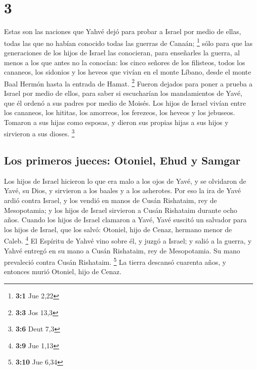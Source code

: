 \hypertarget{section-2}{%
\section{3}\label{section-2}}

 Estas son las naciones que Yahvé dejó para probar a
Israel por medio de ellas, todas las que no habían conocido todas las
guerras de Canaán; \footnote{\textbf{3:1} Jue 2,22}  sólo
para que las generaciones de los hijos de Israel las conocieran, para
enseñarles la guerra, al menos a los que antes no la conocían:
 los cinco señores de los filisteos, todos los cananeos,
los sidonios y los heveos que vivían en el monte Líbano, desde el monte
Baal Hermón hasta la entrada de Hamat. \footnote{\textbf{3:3} Jos 13,3}
 Fueron dejados para poner a prueba a Israel por medio de
ellos, para saber si escucharían los mandamientos de Yavé, que él ordenó
a sus padres por medio de Moisés.  Los hijos de Israel
vivían entre los cananeos, los hititas, los amorreos, los ferezeos, los
heveos y los jebuseos.  Tomaron a sus hijas como esposas,
y dieron sus propias hijas a sus hijos y sirvieron a sus dioses.
\footnote{\textbf{3:6} Deut 7,3}

\hypertarget{los-primeros-jueces-otoniel-ehud-y-samgar}{%
\subsection{Los primeros jueces: Otoniel, Ehud y
Samgar}\label{los-primeros-jueces-otoniel-ehud-y-samgar}}

 Los hijos de Israel hicieron lo que era malo a los ojos
de Yavé, y se olvidaron de Yavé, su Dios, y sirvieron a los baales y a
los asherotes.  Por eso la ira de Yavé ardió contra
Israel, y los vendió en manos de Cusán Rishataim, rey de Mesopotamia; y
los hijos de Israel sirvieron a Cusán Rishataim durante ocho años.
 Cuando los hijos de Israel clamaron a Yavé, Yavé suscitó
un salvador para los hijos de Israel, que los salvó: Otoniel, hijo de
Cenaz, hermano menor de Caleb. \footnote{\textbf{3:9} Jue 1,13}
 El Espíritu de Yahvé vino sobre él, y juzgó a Israel; y
salió a la guerra, y Yahvé entregó en su mano a Cusán Rishataim, rey de
Mesopotamia. Su mano prevaleció contra Cusán Rishataim. \footnote{\textbf{3:10}
  Jue 6,34}  La tierra descansó cuarenta años, y entonces
murió Otoniel, hijo de Cenaz.


